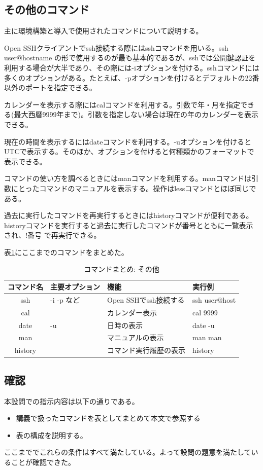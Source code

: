 \documentclass[dvipdfmx,12pt,a4j]{jarticle}
\begin{document}
\subsection{その他のコマンド}
主に環境構築と導入で使用されたコマンドについて説明する。

Open SSHクライアントでssh接続する際にはsshコマンドを用いる。ssh  user@hostname の形で使用するのが最も基本的であるが、sshでは公開鍵認証を利用する場合が大半であり、その際には-iオプションを付ける。sshコマンドには多くのオプションがある。たとえば、-pオプションを付けるとデフォルトの22番以外のポートを指定できる。

カレンダーを表示する際にはcalコマンドを利用する。引数で年・月を指定できる(最大西暦9999年まで)。引数を指定しない場合は現在の年のカレンダーを表示できる。

現在の時間を表示するにはdateコマンドを利用する。-uオプションを付けるとUTCで表示する。そのほか、オプションを付けると何種類かのフォーマットで表示できる。

コマンドの使い方を調べるときにはmanコマンドを利用する。manコマンドは引数にとったコマンドのマニュアルを表示する。操作はlessコマンドとほぼ同じである。

過去に実行したコマンドを再実行するときにはhistoryコマンドが便利である。historyコマンドを実行すると過去に実行したコマンドが番号とともに一覧表示され、!番号 で再実行できる。

表\ref{table:command:other}にここまでのコマンドをまとめた。

\begin{table}[H]
  \caption{コマンドまとめ: その他}
  \label{table:command:other}
  \begin{tabular}{|c|l|l|l|}
    \hline
    コマンド名 & 主要オプション & 機能 & 実行例\\
    \hline \hline
    ssh & -i -p など & Open SSHでssh接続する & ssh user@host \\ 
    cal & & カレンダー表示 & cal 9999\\
    date & -u & 日時の表示 & date -u \\
    man & & マニュアルの表示 & man man \\
    history & & コマンド実行履歴の表示 & history\\
    \hline
  \end{tabular}
\end{table}

\subsection{確認}
本設問での指示内容は以下の通りである。
\begin{itemize}
  \item 講義で扱ったコマンドを表としてまとめて本文で参照する
  \item 表の構成を説明する。
\end{itemize}
ここまででこれらの条件はすべて満たしている。よって設問の題意を満たしていることが確認できた。
\end{document}
